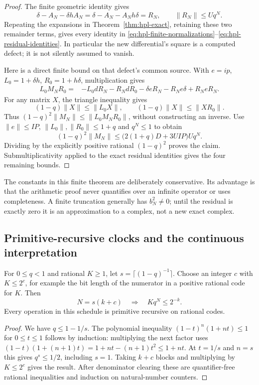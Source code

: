 \begin{proof}
The finite geometric identity gives
\[
 \delta-A_N-\delta hA_N
 =\delta-A_N-A_Nh\delta=R_N,
 \qquad \|R_N\|\le Uq^N.
\]
Repeating the expansions in Theorem~\ref{thm:hpl-exact}, retaining these
two remainder terms, gives every identity in
\eqref{eq:hpl-finite-normalizations}--\eqref{eq:hpl-residual-identities}.  In particular the new differential's
square is a computed defect; it is not silently assumed to vanish.

Here is a direct finite bound on that defect's common source.  With
$e=ip$, $L_0=1+\delta h$, $R_0=1+h\delta$, multiplication gives
\begin{align*}
 L_0M_NR_0={}&-L_0dR_N-R_NdR_0
              -\delta eR_N-R_Ne\delta+R_NeR_N.
\end{align*}
For any matrix $X$, the triangle inequality gives
\[
 (1-q)\|X\|\le\|L_0X\|,
 \qquad (1-q)\|X\|\le\|XR_0\|.
\]
Thus $(1-q)^2\|M_N\|\le\|L_0M_NR_0\|$, without constructing an
inverse.  Use $\|e\|\le IP$, $\|L_0\|,\|R_0\|\le1+q$ and
$q^N\le1$ to obtain
\[
 (1-q)^2\|M_N\|
 \le \bigl(2(1+q)D+3UIP\bigr)Uq^N.
\]
Dividing by the explicitly positive rational $(1-q)^2$ proves the claim.
Submultiplicativity applied to the exact residual identities gives the four
remaining bounds.
\end{proof}

The constants in this finite theorem are deliberately conservative.  Its
advantage is that the arithmetic proof never quantifies over an infinite
operator or uses completeness.  A finite truncation generally has
$b_N^2\ne0$; until the residual is exactly zero it is an approximation to a
complex, not a new exact complex.

\subsection{Primitive-recursive clocks and the continuous interpretation}

\begin{lemma}
\label{lem:hpl-clock}
For $0\le q<1$ and rational $K\ge1$, let
$s=\lceil(1-q)^{-1}\rceil$.  Choose an integer $c$ with $K\le2^c$,
for example the bit length of the numerator in a positive rational code
for $K$.  Then
\[
 N=s(k+c)\quad\Longrightarrow\quad Kq^N\le2^{-k}.
\]
Every operation in this schedule is primitive recursive on rational codes.
\end{lemma}

\begin{proof}
We have $q\le1-1/s$.  The polynomial inequality
$(1-t)^n(1+nt)\le1$ for $0\le t\le1$ follows by induction: multiplying
the next factor uses
$(1-t)(1+(n+1)t)=1+nt-(n+1)t^2\le1+nt$.
At $t=1/s$ and $n=s$ this gives $q^s\le1/2$, including $s=1$.
Taking $k+c$ blocks and multiplying by $K\le2^c$ gives the result.
After denominator clearing these are quantifier-free rational inequalities
and induction on natural-number counters.
\end{proof}

